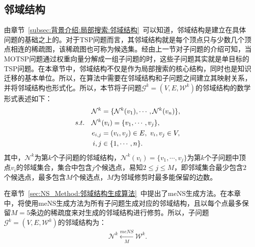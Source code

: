 \subsection{邻域结构}
\label{subsec:NST:邻域结构迁移:邻域结构}
由章节~\ref{subsec:背景介绍:局部搜索:邻域结构}~可以知道，邻域结构是建立在具体问题的基础之上的。对于TSP问题而言，其邻域结构就是每个顶点只与少数几个顶点相连的稀疏图，该稀疏图也可称为候选集。经由上一节对子问题的介绍可知，当MOTSP问题通过权重向量分解成一组子问题的时，这些子问题其实就是单目标的TSP问题。在本章节中，邻域结构不仅是作为局部搜索的核心结构，同时也是知识迁移的基本单位。所以，在算法中需要在邻域结构和子问题之间建立其映射关系，并将邻域结构也形式化。所以，本节将子问题$\mathcal{G}^k= (V, E, \mathcal{W}^k)$的邻域结构的数学形式表述如下：
\begin{align}
    \label{eq:NST:邻域结构}
    \mathcal{N}^{k} & = \{ \mathcal{N}^{k}(v_1), \cdots, \mathcal{N}^{k}(v_n) \},  \\
    s.t. \quad \mathcal{N}^{k} & (v_i) = \{ v_1, \cdots, v_j \}, \notag \\
    e_{i,j} & = (v_i,v_j) \in E, \ v_i,v_j \in V, \notag \\
    i,j & \in \{1, \cdots, n\}. \notag
\end{align}
其中，$\mathcal{N}^{k}$为第$k$个子问题的邻域结构，$\mathcal{N}^{k}(v_i) = \{ v_1, \cdots, v_j \}$为第$k$个子问题中顶点$v_i$的邻域集合，集合中包含$j$个候选点，易知$2 \leq j \leq M$，即邻域集合最少包含$2$个候选点，最多包含$M$个候选点，$M$为邻域修剪时最多能保留的边数。
\par
在章节~\ref{sec:NS_Method:邻域结构生成算法}~中提出了meNS生成方法。在本章中，将使用meNS生成方法为所有子问题生成对应的邻域结构，且以每个点最多保留$M=5$条边的稀疏度来对生成的邻域结构进行修剪。所以，子问题$\mathcal{G}^k = (V, E, \mathcal{W}^k)$的邻域结构为：
\begin{align}
    \label{eq:NST:meNS}
    \mathcal{N}^{k} \xleftarrow[M]{meNS} \mathcal{W}^k.
\end{align}

